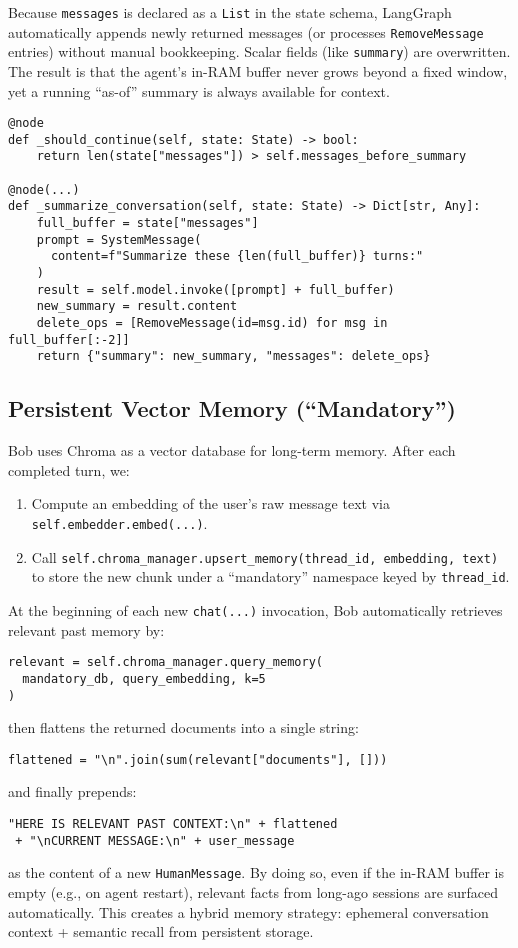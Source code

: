 \documentclass[11pt]{article}
\begin{document}
Because \texttt{messages} is declared as a \texttt{List} in the state schema, LangGraph automatically appends newly returned messages (or processes \texttt{RemoveMessage} entries) without manual bookkeeping. Scalar fields (like \texttt{summary}) are overwritten. The result is that the agent’s in-RAM buffer never grows beyond a fixed window, yet a running “as-of” summary is always available for context.

\begin{verbatim}
@node
def _should_continue(self, state: State) -> bool:
    return len(state["messages"]) > self.messages_before_summary

@node(...)
def _summarize_conversation(self, state: State) -> Dict[str, Any]:
    full_buffer = state["messages"]
    prompt = SystemMessage(
      content=f"Summarize these {len(full_buffer)} turns:"
    )
    result = self.model.invoke([prompt] + full_buffer)
    new_summary = result.content
    delete_ops = [RemoveMessage(id=msg.id) for msg in full_buffer[:-2]]
    return {"summary": new_summary, "messages": delete_ops}
\end{verbatim}

\subsection{Persistent Vector Memory (“Mandatory”)}
Bob uses Chroma as a vector database for long-term memory. After each completed turn, we:
\begin{enumerate}[leftmargin=*]
  \item Compute an embedding of the user’s raw message text via \texttt{self.embedder.embed(...)}.
  \item Call \texttt{self.chroma\_manager.upsert\_memory(thread\_id, embedding, text)} to store the new chunk under a “mandatory” namespace keyed by \texttt{thread\_id}.
\end{enumerate}

At the beginning of each new \texttt{chat(...)} invocation, Bob automatically retrieves relevant past memory by:
\begin{verbatim}
relevant = self.chroma_manager.query_memory(
  mandatory_db, query_embedding, k=5
)
\end{verbatim}
then flattens the returned documents into a single string:
\begin{verbatim}
flattened = "\n".join(sum(relevant["documents"], []))
\end{verbatim}
and finally prepends:
\begin{verbatim}
"HERE IS RELEVANT PAST CONTEXT:\n" + flattened
 + "\nCURRENT MESSAGE:\n" + user_message
\end{verbatim}
as the content of a new \texttt{HumanMessage}. By doing so, even if the in-RAM buffer is empty (e.g., on agent restart), relevant facts from long-ago sessions are surfaced automatically. This creates a hybrid memory strategy: ephemeral conversation context + semantic recall from persistent storage.
\end{document}
